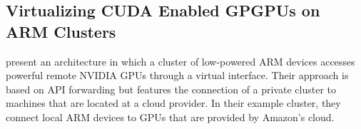 \subsection*{Virtualizing CUDA Enabled GPGPUs on ARM Clusters}

\citeauthor{arm_virtual_cuda} present an architecture in which a cluster of low-powered ARM devices accesses powerful remote NVIDIA GPUs through a virtual interface\cite{arm_virtual_cuda}. Their approach is based on API forwarding but features the connection of a private cluster to machines that are located at a cloud provider. In their example cluster, they connect local ARM devices to GPUs that are provided by Amazon's cloud.

